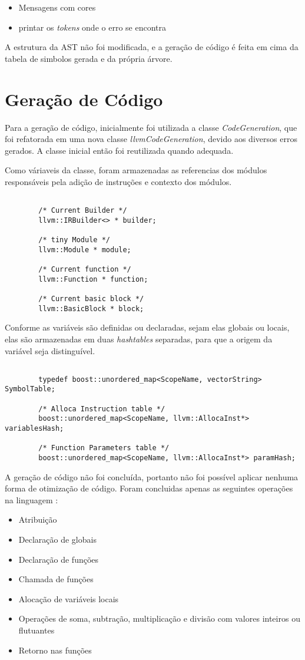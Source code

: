 \documentclass[12pt,a4paper,final]{article}
\begin{document}
\begin{itemize}
\item Mensagens com cores
\item printar os \textit{tokens} onde o erro se encontra
\end{itemize}

A estrutura da AST não foi modificada, e a geração de código é feita em cima da tabela de simbolos gerada e da própria árvore.

\section*{Geração de Código}
Para a geração de código, inicialmente foi utilizada a classe \textit{CodeGeneration}, que foi refatorada em uma nova classe \textit{llvmCodeGeneration}, devido aos diversos erros gerados. A classe inicial então foi reutilizada quando adequada.

Como váriaveis da classe, foram armazenadas as referencias dos módulos responsáveis pela adição de instruções e contexto dos módulos.

\begin{lstlisting}

        /* Current Builder */
        llvm::IRBuilder<> * builder;

        /* tiny Module */
        llvm::Module * module;

        /* Current function */
        llvm::Function * function;

        /* Current basic block */
        llvm::BasicBlock * block;
\end{lstlisting}

Conforme as variáveis são definidas ou declaradas, sejam elas globais ou locais, elas são armazenadas em duas \textit{hashtables} separadas, para que a origem da variável seja distinguível.

\begin{lstlisting}

    	typedef boost::unordered_map<ScopeName, vectorString> SymbolTable;
      
        /* Alloca Instruction table */
        boost::unordered_map<ScopeName, llvm::AllocaInst*> variablesHash;

        /* Function Parameters table */
        boost::unordered_map<ScopeName, llvm::AllocaInst*> paramHash;
\end{lstlisting}

A geração de código não foi concluída, portanto não foi possível aplicar nenhuma forma de otimização de código.
Foram concluidas apenas as seguintes operações na linguagem :
\begin{itemize}
\item Atribuição
\item Declaração de globais
\item Declaração de funções
\item Chamada de funções
\item Alocação de variáveis locais
\item Operações de soma, subtração, multiplicação e divisão com valores inteiros ou flutuantes
\item Retorno nas funções
\end{itemize}
\end{document}
